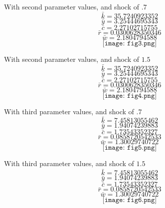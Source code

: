\documentclass[letterpaper,12pt]{article}
\theoremstyle{definition}
\begin{document}
With second parameter values, and shock of $.7$
\[\bar k = 35.7240923352\]
\[\bar y =  3.25444695343 \]
\[\bar c = 2.27102715755 \]
\[\bar r = 0.0300628350346 \]
\[\bar w = 2.1804794588\]
\[\texttt{[image: fig3.png]}\]
   
With second parameter values, and shock of $1.5$
\[\bar k = 35.7240923352\]
\[\bar y =  3.25444695343 \]
\[\bar c = 2.27102715755 \]
\[\bar r = 0.0300628350346 \]
\[\bar w = 2.1804794588\]
\[\texttt{[image: fig4.png]}\]

With third parameter values, and shock of $.7$
\[\bar k = 7.45813055462\]
\[\bar y =  1.94074239883 \]
\[\bar c = 1.73543352327 \]
\[\bar r = 0.0858720542533 \]
\[\bar w = 1.30029740722\]
\[\texttt{[image: fig5.png]}\]
   
With third parameter values, and shock of $1.5$
\[\bar k = 7.45813055462\]
\[\bar y =  1.94074239883 \]
\[\bar c = 1.73543352327 \]
\[\bar r = 0.0858720542533 \]
\[\bar w = 1.30029740722\]
\[\texttt{[image: fig6.png]}\]
\end{document}
